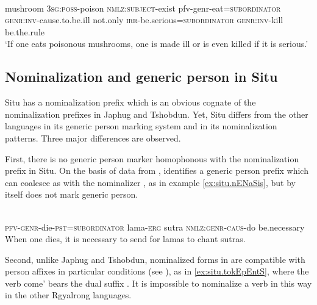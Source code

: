  \begin{exe}
\ex \label{ex:tshobdun.inv}
\gll
{}  	  	  	  	  	  	  	  	  \\
 mushroom \textsc{3sg:poss}-poison \textsc{nmlz:subject}-exist pfv-genr-eat=\textsc{subordinator}  \textsc{genr:inv}-cause.to.be.ill not.only \textsc{irr}-be.serious=\textsc{subordinator}   \textsc{genr:inv}-kill be.the.rule \\
\glt ‘If one eats poisonous mushrooms, one is made ill or is even killed if it is serious.’ 
 \end{exe}
 
 
\subsection{Nominalization and generic person in Situ} \label{situ.nmlz}

   Situ has a nominalization prefix  which is an obvious cognate of the  nominalization prefixes  in    Japhug   and  Tshobdun. Yet, Situ differs from the other languages in its generic person marking system and in its nominalization patterns. Three major differences are observed.

First, there is no generic person  marker  homophonous with the nominalization prefix in Situ.  On the basis of data from \citet[47-9]{wei01ka}, \citet[243-4]{sun14generic} identifies a generic person  prefix which can coalesce as  with the nominalizer , as in example \ref{ex:situ.nENaSis}, but  by itself does not mark generic person. 

 \begin{exe}
\ex \label{ex:situ.nENaSis}
\gll
{}  	  	  	  	  \\
\textsc{pfv-genr}-die-\textsc{pst=subordinator} lama-\textsc{erg} sutra \textsc{nmlz:genr-caus}-do be.necessary \\
\glt When one dies, it is necessary to send for lamas to chant sutras.
  \end{exe}
 
Second, unlike Japhug and Tshobdun, nominalized forms in  are compatible with person affixes in particular conditions (see \citealt[11-12]{jacksonlin07}), as in \ref{ex:situ.tokEpEntS}, where the verb  come' bears the dual suffix . It is impossible to nominalize a verb in this way in the other Rgyalrong languages.

